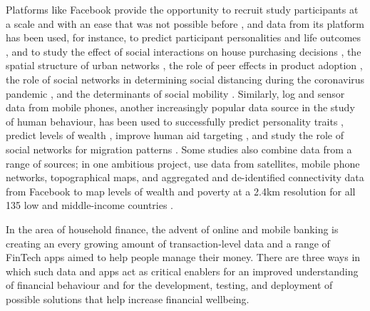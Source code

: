Platforms like Facebook provide the opportunity to recruit study participants
at a scale and with an ease that was not possible before
\citep{kosinski2015facebook}, and data from its platform has been used, for
instance, to predict participant personalities and life outcomes
\citep{youyou2015computer}, and to study the effect of social interactions on
house purchasing decisions \citep{bailey2018economic, bailey2019house}, the
spatial structure of urban networks \citep{bailey2020socialconnectedness}, the role of peer
effects in product adoption \citep{bailey2019peer}, the role of social networks
in determining social distancing during the coronavirus pandemic
\citep{bailey2020socialnetworks}, and the determinants of social mobility
\citep{chetty2022sociali, chetty2022socialii}. Similarly, log and sensor data
from mobile phones, another increasingly popular data source in the study of
human behaviour, has been used to successfully predict personality traits
\citep{montjoye2013predicting, stachl2020predicting}, predict levels of wealth
\citep{blumenstock2015predicting}, improve human aid targeting
\citep{aiken2022machine}, and study the role of social networks for migration
patterns \citep{blumenstock2019migration}. Some studies also combine data from
a range of sources; in one ambitious project, \citet{chi2022microestimates} use
data from satellites, mobile phone networks, topographical maps, and aggregated
and de-identified connectivity data from Facebook to map levels of wealth and
poverty at a 2.4km resolution for all 135 low and middle-income countries
\citep{chi2022microestimates}.

In the area of household finance, the advent of online and mobile banking is
creating an every growing amount of transaction-level data and a range of
FinTech apps aimed to help people manage their money. There are three ways in
which such data and apps act as critical enablers for an improved understanding
of financial behaviour and for the development, testing, and deployment of
possible solutions that help increase financial wellbeing.

